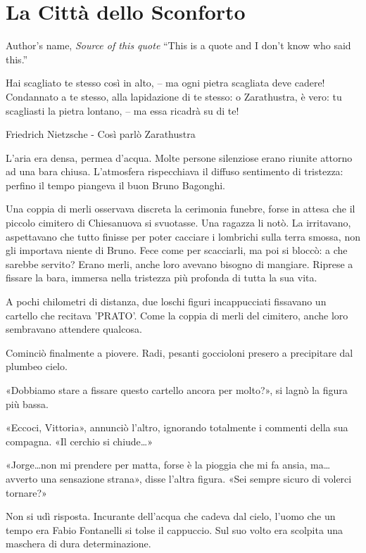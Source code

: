 \chapter{La Città dello Sconforto}

\begin{chapquote}{Author's name, \textit{Source of this quote}}
``This is a quote and I don't know who said this.''
\end{chapquote}


Hai scagliato te stesso così in alto, – ma ogni pietra scagliata deve cadere! Condannato a te stesso, alla lapidazione di te stesso: o Zarathustra, è vero: tu scagliasti la pietra lontano, – ma essa ricadrà su di te!

Friedrich Nietzsche - Così parlò Zarathustra


L'aria era densa, permea d'acqua. Molte persone silenziose erano riunite attorno ad una bara chiusa. L'atmosfera rispecchiava il diffuso sentimento di tristezza: perfino il tempo piangeva il buon Bruno Bagonghi.

Una coppia di merli osservava discreta la cerimonia funebre, forse in attesa che il piccolo cimitero di Chiesanuova si svuotasse. Una ragazza li notò. La irritavano, aspettavano che tutto finisse per poter cacciare i lombrichi sulla terra smossa, non gli importava niente di Bruno. Fece come per scacciarli, ma poi si bloccò: a che sarebbe servito? Erano merli, anche loro avevano bisogno di mangiare. Riprese a fissare la bara, immersa nella tristezza più profonda di tutta la sua vita.

A pochi chilometri di distanza, due loschi figuri incappucciati fissavano un cartello che recitava 'PRATO'. Come la coppia di merli del cimitero, anche loro sembravano attendere qualcosa.

Cominciò finalmente a piovere. Radi, pesanti goccioloni presero a precipitare dal plumbeo cielo.

«Dobbiamo stare a fissare questo cartello ancora per molto?», si lagnò la figura più bassa.

«Eccoci, Vittoria», annunciò l'altro, ignorando totalmente i commenti della sua compagna. «Il cerchio si chiude\ldots»

«Jorge\ldots non mi prendere per matta, forse è la pioggia che mi fa ansia, ma\ldots avverto una sensazione strana», disse l'altra figura. «Sei sempre sicuro di volerci tornare?»

Non si udì risposta. Incurante dell'acqua che cadeva dal cielo, l'uomo che un tempo era Fabio Fontanelli si tolse il cappuccio. Sul suo volto era scolpita una maschera di dura determinazione.

